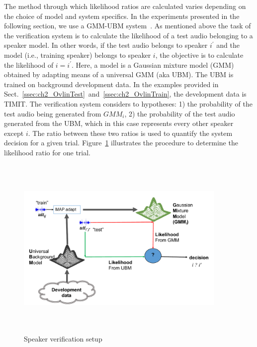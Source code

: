 The method through which likelihood ratios are calculated varies depending on the choice of model and system specifics. 
In the experiments presented in the following section, we use a GMM-UBM system~\cite{reynolds_map}. 
As mentioned above the task of the verification system is to calculate the likelihood of a test audio belonging to a speaker model. 
In other words, if the test audio belongs to speaker $i^\prime$ and the model (i.e., training speaker) belongs to speaker $i$, the objective is to calculate the likelihood of $i=i^\prime$. 
Here, a model is a Gaussian mixture model (GMM) obtained by adapting means of a universal GMM (aka UBM). 
The UBM is trained on background development data. 
In the examples provided in Sect.~\ref{ssec:ch2_OvlinTest}~and~\ref{ssec:ch2_OvlinTrain}, the development data is TIMIT. 
The verification system considers to hypotheses: 1) the probability of the test audio being generated from $GMM_i$, 2) the probability of the test audio generated from the UBM, which in this case represents every other speaker except $i$. 
The ratio between these two ratios is used to quantify the system decision for a given trial. 
Figure~\ref{fig:gmm_ubm_sid} illustrates the procedure to determine the likelihood ratio for one trial. 

\begin{figure}[h!]
	\centering
	\vspace{0mm}
	\includegraphics[height = 3.5in, width=0.9\textwidth]{figures/gmm_ubm_sid_setup}
	\vspace{-3mm}
	\caption{Speaker verification setup}
	\label{fig:gmm_ubm_sid}
	\vspace{0mm}
\end{figure}

